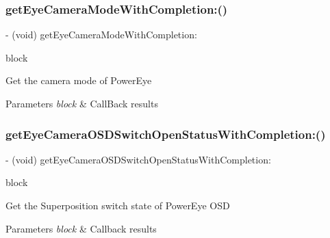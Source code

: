 \subsubsection{\texorpdfstring{get\+Eye\+Camera\+Mode\+With\+Completion\+:()}{getEyeCameraModeWithCompletion:()}}
{\footnotesize\ttfamily -\/ (void) get\+Eye\+Camera\+Mode\+With\+Completion\+: \begin{DoxyParamCaption}\item[{(void($^\wedge$)(P\+V\+Eye\+Camera\+Mode camera\+Mode, N\+S\+Error $\ast$\+\_\+\+Nullable error))}]{block }\end{DoxyParamCaption}}

Get the camera mode of Power\+Eye


\begin{DoxyParams}{Parameters}
{\em block} & Call\+Back results \\
\hline
\end{DoxyParams}
\mbox{\label{interface_p_v_eye_camera_a404f92a7e5fbd7b9424e23743a5f7777}} 
\subsubsection{\texorpdfstring{get\+Eye\+Camera\+O\+S\+D\+Switch\+Open\+Status\+With\+Completion\+:()}{getEyeCameraOSDSwitchOpenStatusWithCompletion:()}}
{\footnotesize\ttfamily -\/ (void) get\+Eye\+Camera\+O\+S\+D\+Switch\+Open\+Status\+With\+Completion\+: \begin{DoxyParamCaption}\item[{(void($^\wedge$)(P\+V\+Eye\+O\+S\+D\+Switch\+State state, N\+S\+Error $\ast$\+\_\+\+Nullable error))}]{block }\end{DoxyParamCaption}}

Get the Superposition switch state of Power\+Eye O\+SD


\begin{DoxyParams}{Parameters}
{\em block} & Callback results \\
\hline
\end{DoxyParams}
\mbox{\label{interface_p_v_eye_camera_adbd5e1425817bc53fd822bf662b33784}} 
